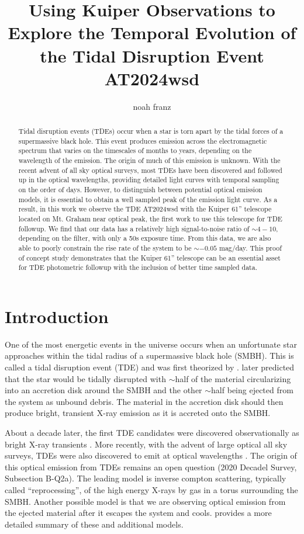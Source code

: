 \documentclass{aastex631}
\begin{document}
\title{Using Kuiper Observations to Explore the Temporal Evolution of the Tidal Disruption Event AT2024wsd}

\author[0000-0003-4537-3575]{noah franz}

\begin{abstract}
  Tidal disruption events (TDEs) occur when a star is torn apart by the tidal forces of a supermassive black hole. This event produces emission across the electromagnetic spectrum that varies on the timescales of months to years, depending on the wavelength of the emission. The origin of much of this emission is unknown. With the recent advent of all sky optical surveys, most TDEs have been discovered and followed up in the optical wavelengths, providing detailed light curves with temporal sampling on the order of days. However, to distinguish between potential optical emission models, it is essential to obtain a well sampled peak of the emission light curve. As a result, in this work we observe the TDE AT2024wsd with the Kuiper 61'' telescope located on Mt. Graham near optical peak, the first work to use this telescope for TDE followup. We find that our data has a relatively high signal-to-noise ratio of $\sim4-10$, depending on the filter, with only a 50s exposure time. From this data, we are also able to poorly constrain the rise rate of the system to be $\sim -0.05$ mag/day. This proof of concept study demonstrates that the Kuiper 61'' telescope can be an essential asset for TDE photometric followup with the inclusion of better time sampled data. 
\end{abstract}

\section{Introduction}
One of the most energetic events in the universe occurs when an unfortunate star approaches within the tidal radius of a supermassive black hole (SMBH). This is called a tidal disruption event (TDE) and was first theorized by \citet{hills1975}. \citet{rees1988} later predicted that the star would be tidally disrupted with $\sim$half of the material circularizing into an accretion disk around the SMBH and the other $\sim$half being ejected from the system as unbound debris. The material in the accretion disk should then produce bright, transient X-ray emission as it is accreted onto the SMBH. 

About a decade later, the first TDE candidates were discovered observationally as bright X-ray transients \citep{donley2002}. More recently, with the advent of large optical all sky surveys, TDEs were also discovered to emit at optical wavelengths \citep{iPTF,ZTF,panstarrstde}. The origin of this optical emission from TDEs remains an open question (2020 Decadel Survey, Subsection B-Q2a). The leading model is inverse compton scattering, typically called ``reprocessing'', of the high energy X-rays by gas in a torus surrounding the SMBH. Another possible model is that we are observing optical emission from the ejected material after it escapes the system and cools. \citet{gezari2021} provides a more detailed summary of these and additional models. 
\end{document}
